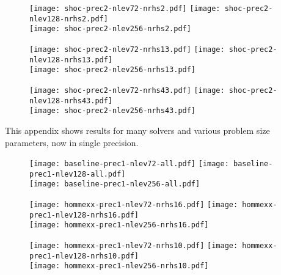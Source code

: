 \documentclass[10pt,twocolumn]{article}
\begin{document}
\begin{figure}[hbt]
  \centering
  \texttt{[image: shoc-prec2-nlev72-nrhs2.pdf]}
  \texttt{[image: shoc-prec2-nlev128-nrhs2.pdf]} \\
  \texttt{[image: shoc-prec2-nlev256-nrhs2.pdf]}
\end{figure}

\begin{figure}[hbt]
  \centering
  \texttt{[image: shoc-prec2-nlev72-nrhs13.pdf]}
  \texttt{[image: shoc-prec2-nlev128-nrhs13.pdf]} \\
  \texttt{[image: shoc-prec2-nlev256-nrhs13.pdf]}
\end{figure}

\begin{figure}[hbt]
  \centering
  \texttt{[image: shoc-prec2-nlev72-nrhs43.pdf]}
  \texttt{[image: shoc-prec2-nlev128-nrhs43.pdf]} \\
  \texttt{[image: shoc-prec2-nlev256-nrhs43.pdf]}
\end{figure}

\clearpage
{}
This appendix shows results for many solvers and various problem size parameters, now in single precision.

\begin{figure}[hbt]
  \centering
  \texttt{[image: baseline-prec1-nlev72-all.pdf]}
  \texttt{[image: baseline-prec1-nlev128-all.pdf]} \\
  \texttt{[image: baseline-prec1-nlev256-all.pdf]}
\end{figure}

\begin{figure}[hbt]
  \centering
  \texttt{[image: hommexx-prec1-nlev72-nrhs16.pdf]}
  \texttt{[image: hommexx-prec1-nlev128-nrhs16.pdf]} \\
  \texttt{[image: hommexx-prec1-nlev256-nrhs16.pdf]}
\end{figure}

\begin{figure}[hbt]
  \centering
  \texttt{[image: hommexx-prec1-nlev72-nrhs10.pdf]}
  \texttt{[image: hommexx-prec1-nlev128-nrhs10.pdf]} \\
  \texttt{[image: hommexx-prec1-nlev256-nrhs10.pdf]}
\end{figure}
\end{document}
